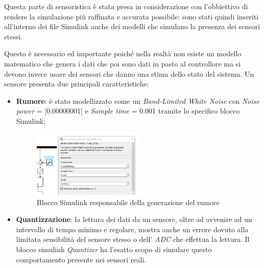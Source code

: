 Questa parte di sensoristica è stata presa in considerazione con l'obbiettivo di rendere la simulazione più raffinata e accurata possibile: sono stati quindi inseriti all'interno dei file Simulink anche dei modelli che simulano la presenza dei sensori stessi.

Questo è necessario ed importante poiché nella realtà non esiste un modello matematico che genera i dati che poi sono dati in pasto al controllore ma si devono invece usare dei sensori che danno una stima dello stato del sistema. Un sensore presenta due principali caratteristiche: 
\begin{itemize}
	\item \textbf{Rumore}: è stato modellizzato come un \textit{Band-Limited
	White Noise} con \textit{Noise power} = [0.00000001] e \textit{Sample time} = 0.001 tramite lo specifico blocco Simulink;
	\begin{figure}[H]
		\centering   	
		\includegraphics[width=0.5\textwidth]{Immagini/band_limited_white_noise.png}
		\caption{Blocco Simulink responsabile della generazione del rumore}
		\label{fig:band_limited_wn}
	\end{figure}
	\item \textbf{Quantizzazione}: la lettura dei dati da un sensore, oltre ad avvenire ad un intervallo di tempo minimo e regolare, mostra anche un errore dovuto alla limitata sensibilità del sensore stesso o dell' \textit{ADC} che effettua la lettura. Il blocco simulink \textit{Quantizer} ha l'esatto scopo di simulare questo comportamento presente nei sensori reali.
\end{itemize}


